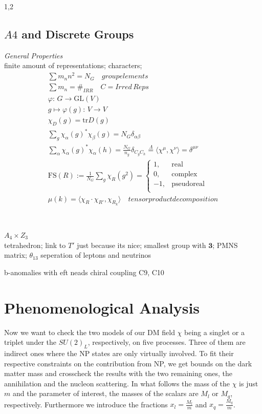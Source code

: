 \documentclass[11pt,a4paper,twoside]{article}
\numberwithin{equation}{section}
\begin{document}
\begin{spacing}{1,2}
\subsection{$A4$ and Discrete Groups}
\label{sec_A4GT}
\textit{General Properties}\\
finite amount of representations; characters; 
 \begin{align}
  \sum m_n n^2 = N_G \quad groupelements\\
  \sum m_n = \#_{IRR} \quad C = Irred\,Reps\\
  \varphi:\, G\rightarrow \text{GL}(V)\\
  g\mapsto \varphi(g):\, V\rightarrow V\\
  \chi_D(g) = \text{tr}D(g)\\
  \sum_g \chi_\alpha(g)^*\chi_\beta(g) = N_G \delta_{\alpha\beta}\\
  \sum_\alpha \chi_\alpha(g)^*\chi_\alpha(h) = \frac{N_G}{n_g} \delta_{C_g C_h} \stackrel{\Lambda}{=} \langle \chi^\mu, \chi^\nu \rangle = \delta^{\mu\nu}\\
  \text{FS}(R) := \frac{1}{N_G} \sum_g \chi_R(g^2) =\begin{cases}
                                                     1, & \text{real}\\
                                                     0, & \text{complex}\\
                                                     -1, & \text{pseudoreal}\\
                                                    \end{cases}\\
  \mu(k) = \langle \chi_R \cdot \chi_{R'} , \chi_{R_k} \rangle \quad tensor product decomposition\\
 \end{align}
 \\ \\ \textit{$A_4\times Z_3$}\\
 tetrahedron; link to $T'$ just because its nice; smallest group with $\boldsymbol{3}$; PMNS matrix; $\theta_{13}$
 seperation of leptons and neutrinos


b-anomalies with eft neads chiral coupling C9, C10

\section{Phenomenological Analysis}
Now we want to check the two models of our DM field $\chi$ being a singlet or a triplet under the $SU(2)_L$, respectively, on five processes. Three of them
are indirect ones where the NP states are only virtually involved. To fit their respective constraints on the contribution from NP, we get bounds on 
the dark matter mass and crosscheck the results with the two remaining ones, the annihilation and the nucleon scattering. In what follows the mass
of the $\chi$ is just $m$ and the parameter of interest, the masses of the scalars are $M_l$ or $M_q$, respectively. Furthermore we introduce the fractions
$x_l=\frac{M_l}{m}$ and $x_q = \frac{M_q}{m}$. 


\end{spacing}
\end{document}
